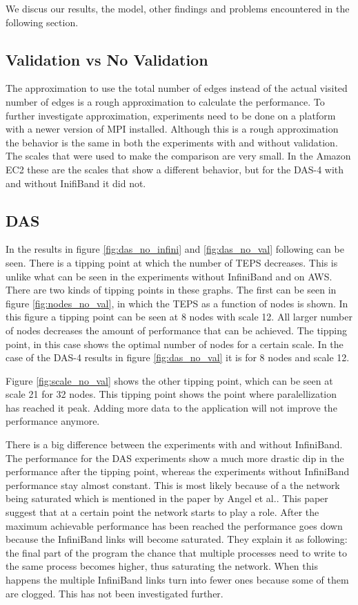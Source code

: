 We discus our results, the model, other findings and problems encountered in the following section.

\subsection{Validation vs No Validation}
\label{dis:val}
The approximation to use the total number of edges instead of the actual visited number of edges is a rough approximation to calculate the performance. To further investigate approximation, experiments need to be done on a platform with a newer version of MPI installed. Although this is a rough approximation the behavior is the same in both the experiments with and without validation.
The scales that were used to make the comparison are very small. In the Amazon EC2 these are the scales that show a different behavior, but for the DAS-4 with and without InifiBand it did not. 

\subsection{DAS}
In the results in figure \ref{fig:das_no_infini} and  \ref{fig:das_no_val} following can be seen. There is a tipping point at which the number of TEPS decreases. This is unlike what can be seen in the experiments without InfiniBand and on AWS. There are two kinds of tipping points in these graphs. The first can be seen in  figure \ref{fig:nodes_no_val}, in which the TEPS as a function of nodes is shown. In this figure a tipping point can be seen at 8 nodes with scale 12. All larger number of nodes decreases the amount of performance that can be achieved. The tipping point, in this case shows the optimal number of nodes for a certain scale. In the case of the DAS-4 results in figure \ref{fig:das_no_val} it is for 8 nodes and scale 12.

Figure \ref{fig:scale_no_val} shows the other tipping point, which can be seen at scale 21 for 32 nodes. This tipping point shows the point where paralellization has reached it peak. Adding more data to the application will not improve the performance anymore. 

There is a big difference between the experiments with and without InfiniBand. The performance for the DAS experiments show a much more drastic dip in the performance after the tipping point, whereas the experiments without InfiniBand performance stay almost constant. This is most likely because of a the network being saturated which is mentioned in the paper by Angel et al.\cite{angel2012graph}. This paper suggest that at a certain point the network starts to play a role.  After the maximum achievable performance has been reached the performance goes down because the InfiniBand links will become saturated. They explain it as following: the final part of the program the chance that multiple processes need to write to the same process becomes higher, thus saturating the network. When this happens the multiple InfiniBand links turn into fewer ones because some of them are clogged. This has not been investigated further. 

